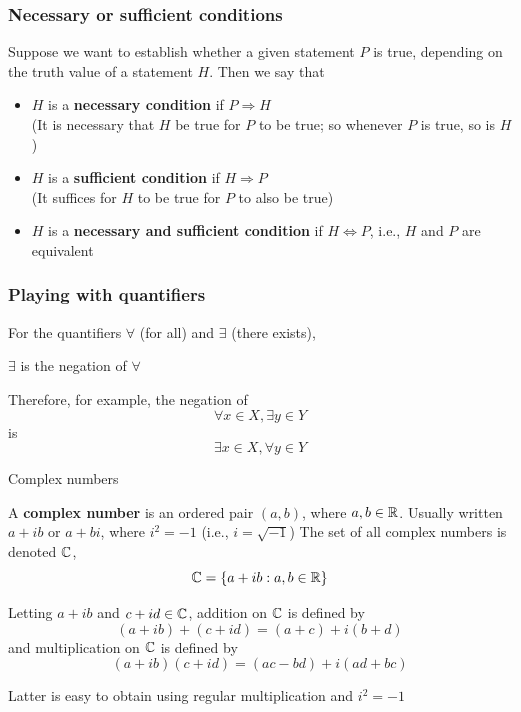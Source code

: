 \documentclass[aspectratio=169]{beamer}\usepackage[]{graphicx}\usepackage[]{xcolor}
\begin{document}
\begin{frame}
\frametitle{Necessary or sufficient conditions}
	Suppose we want to establish whether a given statement $P$ is true, depending
	on the truth value of a statement $H$. Then we say that
	\begin{itemize}
		\item $H$ is a \textbf{necessary condition} if $P\Rightarrow H$ \\
		(It is necessary that $H$ be true for $P$ to be true; so whenever
		$P$ is true, so is $H$)
		\vfill
		\item $H$ is a \textbf{sufficient condition} if $H\Rightarrow P$ \\
		(It suffices for $H$ to be true for $P$ to also be true)
		\vfill
		\item $H$ is a \textbf{necessary and sufficient condition} if $H\Leftrightarrow
		P$, i.e., $H$ and $P$ are equivalent
	\end{itemize}
\end{frame}

\begin{frame}
\frametitle{Playing with quantifiers}
	For the quantifiers $\forall$ (for all) and $\exists$ (there exists),
	\begin{center}
		$\exists$ is the negation of $\forall$
	\end{center}
	\vfill
	Therefore, for example, the negation of
	\[
	\forall x\in X,\exists y\in Y
	\]
	is
	\[
	\exists x\in X,\forall y\in Y
	\]
\end{frame}


\begin{frame}{Complex numbers}
	\begin{importantdefinition}
		A \textbf{complex number} is an ordered pair $(a,b)$, where $a,b\in\mathbb{R}$. Usually written $a+ib$ or $a+bi$, where $i^2=-1$ (i.e., $i=\sqrt{-1}$)
		\vfill
		The set of all complex numbers is denoted $\mathbb{C}$, 
		\[
		\mathbb{C}=\{a+ib: a,b\in\mathbb{R}\}
		\]
	\end{importantdefinition}
\end{frame}

\begin{frame}
	\begin{definition}
		Letting $a+ib$ and $c+id\in\mathbb{C}$, addition on $\mathbb{C}$ is defined by
		\[
		(a+ib)+(c+id) = (a+c)+i(b+d)
		\]
		and multiplication on $\mathbb{C}$ is defined by
		\[
		(a+ib)(c+id) = (ac-bd)+i(ad+bc)
		\]
	\end{definition}
	\vfill
	Latter is easy to obtain using regular multiplication and $i^2=-1$
\end{frame}
\end{document}
